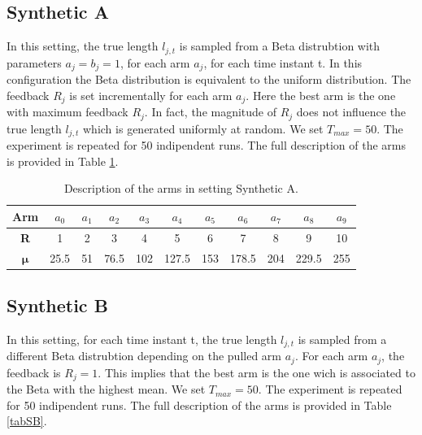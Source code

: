 \subsection{Synthetic A}\label{SA}
In this setting, the true length $l_{j,t}$ is sampled from a Beta distrubtion with parameters $a_j = b_j = 1$, for each arm $a_j$, for each time instant t. In this configuration the Beta distribution is equivalent to the uniform distribution. The feedback $R_j$ is set incrementally for each arm $a_j$. Here the best arm is the one with maximum feedback $R_j$. In fact, the magnitude of $R_j$ does not influence the true length $l_{j,t}$ which is generated uniformly at random.  We set $T_{max} = 50$. The experiment is repeated for 50 indipendent runs. The full description of the arms is provided in Table \ref{tabSA}.



\begin{table}[H]
	
	\centering	
	\caption{Description of the arms in setting Synthetic A.}
	\begin{tabular}{|c|cccccccccc|}
		\hline
		\textbf{Arm}       & $a_0$ & $a_1$ & $a_2$ & $a_3$ & $a_4$ & $a_5$ & $a_6$ & $a_7$ & $a_8$ & $a_9$ \\ \hline
		\textbf{R}         & 1     & 2     & 3     & 4     & 5     & 6     & 7     & 8     & 9     & 10    \\
		$\boldsymbol{\mu}$ & 25.5  & 51    & 76.5  & 102   & 127.5 & 153   & 178.5 & 204   & 229.5 & 255   \\ \hline
	\end{tabular}
	
\label{tabSA}
\end{table}
\subsection{Synthetic B}
In this setting, for each time instant t, the true length $l_{j,t}$ is sampled from a different Beta distrubtion depending on the pulled arm $a_j$. For each arm $a_j$, the feedback is $R_j=1$. This implies that the best arm is the one wich is associated to the Beta with the highest mean. We set $T_{max}=50$. The experiment is repeated for 50 indipendent runs. The full description of the arms is provided in Table \ref{tabSB}.


